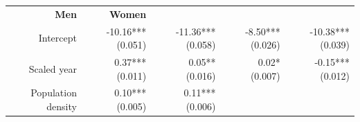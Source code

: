 \documentclass[]{article}
\begin{document}
\begin{longtable}[c]{@{}rrrrr@{}}
\begin{minipage}[t]{0.18\columnwidth}\raggedleft\strut
\textbf{Men}
\strut\end{minipage} &
\begin{minipage}[t]{0.15\columnwidth}\raggedleft\strut
\textbf{Women}
\strut\end{minipage}\tabularnewline
\begin{minipage}[t]{0.17\columnwidth}\raggedleft\strut
Intercept
\strut\end{minipage} &
\begin{minipage}[t]{0.20\columnwidth}\raggedleft\strut
-10.16*** (0.051)
\strut\end{minipage} &
\begin{minipage}[t]{0.16\columnwidth}\raggedleft\strut
-11.36*** (0.058)
\strut\end{minipage} &
\begin{minipage}[t]{0.18\columnwidth}\raggedleft\strut
-8.50*** (0.026)
\strut\end{minipage} &
\begin{minipage}[t]{0.15\columnwidth}\raggedleft\strut
-10.38*** (0.039)
\strut\end{minipage}\tabularnewline
\begin{minipage}[t]{0.17\columnwidth}\raggedleft\strut
Scaled year
\strut\end{minipage} &
\begin{minipage}[t]{0.20\columnwidth}\raggedleft\strut
0.37*** (0.011)
\strut\end{minipage} &
\begin{minipage}[t]{0.16\columnwidth}\raggedleft\strut
0.05** (0.016)
\strut\end{minipage} &
\begin{minipage}[t]{0.18\columnwidth}\raggedleft\strut
0.02* (0.007)
\strut\end{minipage} &
\begin{minipage}[t]{0.15\columnwidth}\raggedleft\strut
-0.15*** (0.012)
\strut\end{minipage}\tabularnewline
\begin{minipage}[t]{0.17\columnwidth}\raggedleft\strut
Population density
\strut\end{minipage} &
\begin{minipage}[t]{0.20\columnwidth}\raggedleft\strut
0.10*** (0.005)
\strut\end{minipage} &
\begin{minipage}[t]{0.16\columnwidth}\raggedleft\strut
0.11*** (0.006)
\strut\end{minipage} &

\end{longtable}
\end{document}
